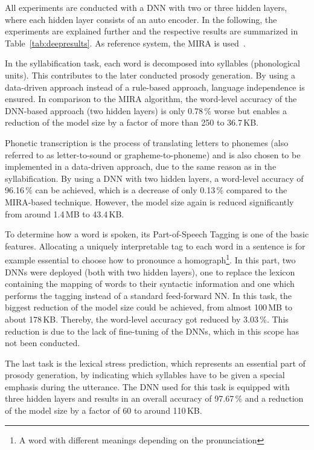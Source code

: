 All experiments are conducted with a \ac{DNN} with two or three hidden layers, where each hidden layer consists of an auto encoder.
In the following, the experiments are explained further and the respective results are summarized in Table~\ref{tab:deepresults}. As reference system, the \ac{MIRA} is used~\cite{boros:mira}.

In the syllabification task, each word is decomposed into syllables (phonological units). This contributes to the later conducted prosody generation. By using a data-driven approach instead of a rule-based approach, language independence is ensured. In comparison to the \ac{MIRA} algorithm, the word-level accuracy of the \ac{DNN}-based approach (two hidden layers) is only 0.78\,\% worse but enables a reduction of the model size by a factor of more than 250 to 36.7\,KB.

Phonetic transcription is the process of translating letters to phonemes (also referred to as letter-to-sound or grapheme-to-\break phoneme) and is also chosen to be implemented in a data-driven approach, due to the same reason as in the syllabification. By using a \ac{DNN} with two hidden layers, a word-level accuracy of 96.16\,\% can be achieved, which is a decrease of only 0.13\,\% compared to the \ac{MIRA}-based technique. However, the model size again is reduced significantly from around 1.4\,MB to 43.4\,KB.

To determine how a word is spoken, its Part-of-Speech Tagging is one of the basic features. Allocating a uniquely interpretable tag to each word in a sentence is for example essential to choose how to pronounce a homograph\footnote{A word with different meanings depending on the pronunciation}. In this part, two \acp{DNN} were deployed (both with two hidden layers), one to replace the lexicon containing the mapping of words to their syntactic information and one which performs the tagging instead of a standard feed-forward \ac{NN}. In this task, the biggest reduction of the model size could be achieved, from almost 100\,MB to about 178\,KB. Thereby, the word-level accuracy got reduced by 3.03\,\%. This reduction is due to the lack of fine-tuning of the \acp{DNN}, which in this scope has not been conducted.

The last task is the lexical stress prediction, which represents an essential part of prosody generation, by indicating which syllables have to be given a special emphasis during the utterance. The \ac{DNN} used for this task is equipped with three hidden layers and results in an overall accuracy of 97.67\,\% and a reduction of the model size by a factor of 60 to around 110\,KB.

